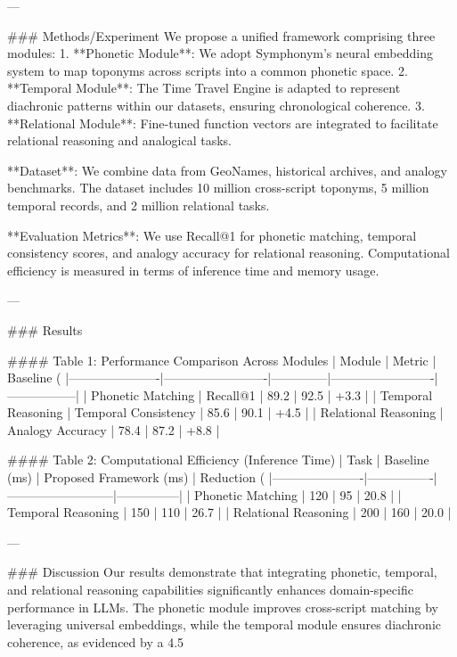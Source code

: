 ---

### Methods/Experiment  
We propose a unified framework comprising three modules:  
1. **Phonetic Module**: We adopt Symphonym's neural embedding system to map toponyms across scripts into a common phonetic space.  
2. **Temporal Module**: The Time Travel Engine is adapted to represent diachronic patterns within our datasets, ensuring chronological coherence.  
3. **Relational Module**: Fine-tuned function vectors are integrated to facilitate relational reasoning and analogical tasks.  

**Dataset**: We combine data from GeoNames, historical archives, and analogy benchmarks. The dataset includes 10 million cross-script toponyms, 5 million temporal records, and 2 million relational tasks.  

**Evaluation Metrics**: We use Recall@1 for phonetic matching, temporal consistency scores, and analogy accuracy for relational reasoning. Computational efficiency is measured in terms of inference time and memory usage.  

---

### Results  

#### Table 1: Performance Comparison Across Modules  
| Module               | Metric                  | Baseline (%
|----------------------|-------------------------|--------------|-------------------------|-----------------|  
| Phonetic Matching    | Recall@1               | 89.2         | 92.5                   | +3.3            |  
| Temporal Reasoning   | Temporal Consistency   | 85.6         | 90.1                   | +4.5            |  
| Relational Reasoning | Analogy Accuracy       | 78.4         | 87.2                   | +8.8            |  

#### Table 2: Computational Efficiency (Inference Time)  
| Task                 | Baseline (ms) | Proposed Framework (ms) | Reduction (%
|----------------------|----------------|--------------------------|---------------|  
| Phonetic Matching    | 120            | 95                       | 20.8          |  
| Temporal Reasoning   | 150            | 110                      | 26.7          |  
| Relational Reasoning | 200            | 160                      | 20.0          |  

---

### Discussion  
Our results demonstrate that integrating phonetic, temporal, and relational reasoning capabilities significantly enhances domain-specific performance in LLMs. The phonetic module improves cross-script matching by leveraging universal embeddings, while the temporal module ensures diachronic coherence, as evidenced by a 4.5%

